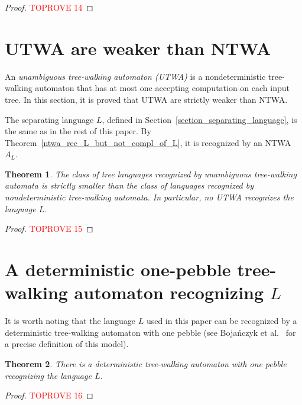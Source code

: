 \documentclass[12pt,a4paper]{article}
\newtheorem{theorem}{Theorem}
\theoremstyle{definition}
\begin{document}
\begin{proof}\textcolor{red}{TOPROVE 14}\end{proof}






\section{UTWA are weaker than NTWA}\label{section_utwa_weaker_than_ntwa}

An \emph{unambiguous tree-walking automaton (UTWA)}
is a nondeterministic tree-walking automaton
that has at most one accepting computation
on each input tree.
In this section, it is proved that UTWA are strictly weaker than NTWA.

The separating language $L$, defined in Section~\ref{section_separating_language},
is the same as in the rest of this paper.
By Theorem~\ref{ntwa_rec_L_but_not_compl_of_L},
it is recognized by an NTWA $A_L$.

\begin{theorem}\label{theorem_utwa_strictly_weaker_than_ntwa}
The class of tree languages recognized by unambiguous tree-walking automata
is strictly smaller than the class of languages recognized by nondeterministic tree-walking automata.
In particular, no UTWA recognizes the language $L$.
\end{theorem}
\begin{proof}\textcolor{red}{TOPROVE 15}\end{proof}





\section{A deterministic one-pebble tree-walking automaton recognizing $L$}

It is worth noting that the language $L$ used in this paper
can be recognized by a deterministic tree-walking automaton with one pebble
(see Boja\'nczyk et al.~\cite{BojanczykSamuelidesSchwentickSegoufin}
for a precise definition of this model).

\begin{theorem}
There is a deterministic tree-walking automaton with one pebble
recognizing the language $L$.
\end{theorem}
\begin{proof}\textcolor{red}{TOPROVE 16}\end{proof}
\end{document}
